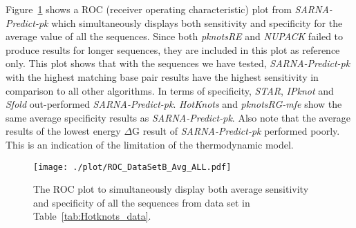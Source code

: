 \documentclass{doublecol-new}
\theoremstyle{TH}{
\newtheorem{lemma}{Lemma}
\newtheorem{theorem}[lemma]{Theorem}
\newtheorem{corrolary}[lemma]{Corrolary}
\newtheorem{conjecture}[lemma]{Conjecture}
\newtheorem{proposition}[lemma]{Proposition}
\newtheorem{claim}[lemma]{Claim}
\newtheorem{stheorem}[lemma]{Wrong Theorem}
\newtheorem{algorithm}{Algorithm}
}
\theoremstyle{THrm}{
\newtheorem{definition}{Definition}
\newtheorem{question}{Question}
\newtheorem{remark}{Remark}
\newtheorem{scheme}{Scheme}
}
\theoremstyle{THhit}{
\newtheorem{case}{Case}[section]
}
\begin{document}
\begin{table*}[ht]
\begin{center}
\begin{tabular}
\hline
\end{tabular}
\end{center}
\end{table*}

Figure~\ref{fig:ROC_DataSetB_PK_ALL}
shows a ROC (receiver operating characteristic) plot from {\em SARNA-Predict-pk} which
simultaneously displays both sensitivity and specificity for the average value of all the
sequences.
Since both {\em pknotsRE} and {\em NUPACK} failed to produce results for longer sequences,
they are included in this plot as reference only.
This plot shows that with the sequences we have tested, {\em SARNA-Predict-pk} with the highest
matching base pair results have the highest sensitivity in comparison to all other algorithms.
In terms of specificity, {\em STAR}, {\em IPknot} and {\em Sfold } out-performed {\em SARNA-Predict-pk}.
{\em HotKnots} and {\em pknotsRG-mfe} show the same average specificity results as {\em SARNA-Predict-pk}.
Also note that the average results of the lowest energy
$\Delta$G result of {\em SARNA-Predict-pk} performed poorly. 
This is an indication of the limitation of the thermodynamic model.

\begin{figure}[t]
   \begin{center}
      \texttt{[image: ./plot/ROC\_DataSetB\_Avg\_ALL.pdf]}
      \caption{The ROC plot to simultaneously display both
        average sensitivity and specificity of all the sequences from data set in Table~\ref{tab:Hotknots_data}.\label{fig:ROC_DataSetB_PK_ALL}}
   \end{center}
\end{figure}


\end{document}
